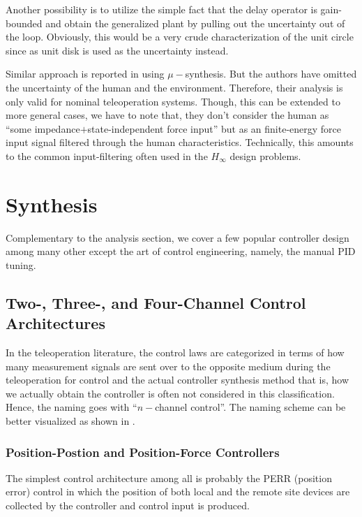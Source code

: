 Another possibility is to utilize the simple fact that the delay operator is gain-bounded and obtain the 
generalized plant by pulling out the uncertainty out of the loop. Obviously, this would be a very crude
characterization of the unit circle since as unit disk is used as the uncertainty instead. 

Similar approach is reported in \cite{leungfa} using $\mu-$synthesis. But the authors have omitted 
the uncertainty of the human and the environment. Therefore, their analysis is only valid for nominal 
teleoperation systems. Though, this can be extended to more general cases, we have to note that, they 
don't consider the human as ``some impedance$+$state-independent force input'' but as an finite-energy
force input signal filtered through the human characteristics. Technically, this amounts to the common 
input-filtering often used in the $H_\infty$ design problems. 

 










\section{Synthesis}

Complementary to the analysis section, we cover a few popular controller design among many other except the 
art of control engineering, namely, the manual PID tuning. 

\subsection{Two-, Three-, and Four-Channel Control Architectures}
In the teleoperation literature, the control laws are categorized in terms of how many measurement signals 
are sent over to the opposite medium during the teleoperation for control and the actual controller synthesis method
that is, how we actually obtain the controller is often not considered in this classification.  Hence, the naming 
goes with ``$n-$channel control''. The naming scheme can be better visualized as shown in . 


\subsubsection{Position-Postion and Position-Force Controllers}
The simplest control architecture among all is probably the PERR (position error) control in which the 
position of both local and the remote site devices are collected by the controller and control input is
produced.

